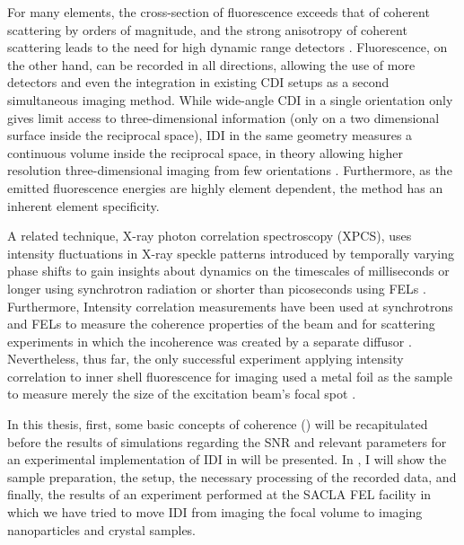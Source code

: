 For many elements, the cross-section of fluorescence exceeds that of coherent scattering by orders of magnitude, and the strong anisotropy of coherent scattering leads to the need for high dynamic range detectors \cite{xraylib}.  Fluorescence, on the other hand, can be recorded in all directions, allowing the use of more detectors and even the integration in existing CDI setups as a second simultaneous imaging method. While wide-angle CDI in a single orientation only gives limit access to three-dimensional information  (only on a two dimensional surface inside the reciprocal space), IDI in the same geometry measures a continuous volume inside the reciprocal space, in theory allowing higher resolution three-dimensional imaging from few orientations \cite{barke2015,classen2017}. Furthermore, as the emitted fluorescence energies are highly element dependent, the method has an inherent element specificity.

A related technique, X-ray photon correlation spectroscopy (XPCS), uses intensity fluctuations in X-ray speckle patterns introduced by temporally varying phase shifts to gain insights about dynamics on the timescales of milliseconds or longer using synchrotron radiation or shorter than picoseconds using FELs \cite{lehmkuhler2021,grubel2007}. Furthermore, Intensity correlation measurements have been used at synchrotrons and FELs to measure the coherence properties of the beam and for scattering experiments in which the incoherence was created by a separate diffusor \cite{yabashi2002,singer2013,inoue2019,gorobtsov2018,schneider2018}.  Nevertheless, thus far, the only successful experiment applying intensity correlation to inner shell fluorescence for imaging used a metal foil as the sample to measure merely the size of the excitation beam's focal spot \cite{nakumura2020}.

In this thesis, first, some basic concepts of coherence () will be recapitulated before the results of simulations regarding the SNR and relevant parameters for an experimental implementation of IDI in  will be presented. In , I will show the sample preparation, the setup, the necessary processing of the recorded data, and finally, the results of an experiment performed at the SACLA FEL facility in which we have tried to move IDI from imaging the focal volume to imaging nanoparticles and crystal samples.

\cleardoublepage
